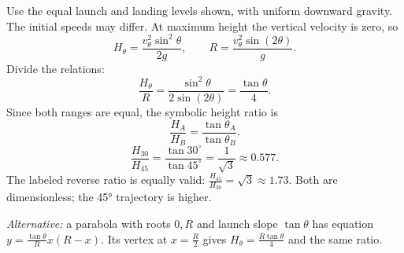 \quizpairbreak
\begin{problem}[25 pts]
\end{problem}
\begin{solution}
Use the equal launch and landing levels shown, with uniform downward
gravity. The initial speeds may differ.
At maximum height the vertical velocity is zero, so
\[
H_\theta=\frac{v_\theta^2\sin^2\theta}{2g},
\qquad R=\frac{v_\theta^2\sin(2\theta)}{g}.
\]
Divide the relations:
\[
\frac{H_\theta}{R}
=\frac{\sin^2\theta}{2\sin(2\theta)}
=\frac{\tan\theta}{4}.
\]
Since both ranges are equal, the symbolic height ratio is
\[
\frac{H_A}{H_B}=\frac{\tan\theta_A}{\tan\theta_B}.
\]
\[
\frac{H_{30}}{H_{45}}
=\frac{\tan30^\circ}{\tan45^\circ}
=\frac{1}{\sqrt3}\approx0.577.
\]
The labeled reverse ratio is equally valid:
$\frac{H_{45}}{H_{30}}=\sqrt3\approx1.73$.
Both are dimensionless; the \ang{45} trajectory is higher.

\textit{Alternative:} a parabola with roots $0,R$ and launch slope
$\tan\theta$ has equation
$y=\frac{\tan\theta}{R}x(R-x)$.
Its vertex at $x=\frac{R}{2}$ gives
$H_\theta=\frac{R\tan\theta}{4}$ and the same ratio.
\end{solution}

